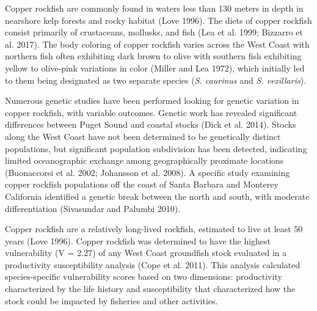 \documentclass[11pt,
  english,
  a4paper,
]{article}
\begin{document}
\leavevmode\tagmcend\tagstructend\par


Copper rockfish are commonly found in waters less than 130 meters in depth in nearshore kelp forests and rocky habitat {(Love 1996)\leavevmode\tagmcend\tagstructend}. The diets of copper rockfish consist primarily of crustaceans, mollusks, and fish {(Lea et al. 1999; Bizzarro et al. 2017)\leavevmode\tagmcend\tagstructend}. The body coloring of copper rockfish varies across the West Coast with northern fish often exhibiting dark brown to olive with southern fish exhibiting yellow to olive-pink variations in color {(Miller and Lea 1972)\leavevmode\tagmcend\tagstructend}, which initially led to them being designated as two separate species (\emph{S. caurinus} and \emph{S. vexillaris}).

\leavevmode\tagmcend\tagstructend\par


Numerous genetic studies have been performed looking for genetic variation in copper rockfish, with variable outcomes. Genetic work has revealed significant differences between Puget Sound and coastal stocks {(Dick et al. 2014)\leavevmode\tagmcend\tagstructend}. Stocks along the West Coast have not been determined to be genetically distinct populations, but significant population subdivision has been detected, indicating limited oceanographic exchange among geographically proximate locations {(Buonaccorsi et al. 2002; Johansson et al. 2008)\leavevmode\tagmcend\tagstructend}. A specific study examining copper rockfish populations off the coast of Santa Barbara and Monterey California identified a genetic break between the north and south, with moderate differentiation {(Sivasundar and Palumbi 2010)\leavevmode\tagmcend\tagstructend}.

\leavevmode\tagmcend\tagstructend\par


Copper rockfish are a relatively long-lived rockfish, estimated to live at least 50 years {(Love 1996)\leavevmode\tagmcend\tagstructend}. Copper rockfish was determined to have the highest vulnerability (V = 2.27) of any West Coast groundfish stock evaluated in a productivity susceptibility analysis {(Cope et al. 2011)\leavevmode\tagmcend\tagstructend}. This analysis calculated species-specific vulnerability scores based on two dimensions: productivity characterized by the life history and susceptibility that characterized how the stock could be impacted by fisheries and other activities.
\end{document}
